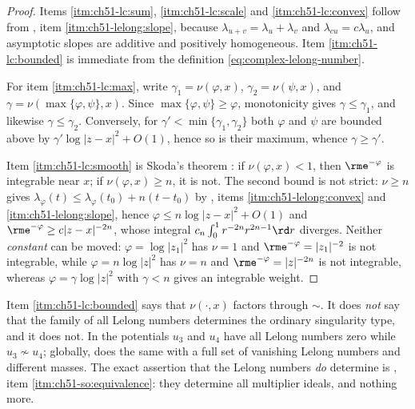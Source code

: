 \begin{proof}
Items \cref{itm:ch51-lc:sum}, \cref{itm:ch51-lc:scale} and
\cref{itm:ch51-lc:convex} follow from
, item \cref{itm:ch51-lelong:slope}, because
\(\lambda_{u+v}=\lambda_u+\lambda_v\) and
\(\lambda_{cu}=c\lambda_u\), and asymptotic slopes are additive and
positively homogeneous.  Item \cref{itm:ch51-lc:bounded} is immediate from
the definition \eqref{eq:complex-lelong-number}.

For item \cref{itm:ch51-lc:max}, write \(\gamma_1=\nu(\varphi,x)\),
\(\gamma_2=\nu(\psi,x)\), and \(\gamma=\nu(\max\{\varphi,\psi\},x)\).
Since \(\max\{\varphi,\psi\}\geq\varphi\), monotonicity gives
\(\gamma\leq\gamma_1\), and likewise \(\gamma\leq\gamma_2\).  Conversely,
for \(\gamma'<\min\{\gamma_1,\gamma_2\}\) both \(\varphi\) and \(\psi\)
are bounded above by \(\gamma'\log|z-x|^2+O(1)\), hence so is their
maximum, whence \(\gamma\geq\gamma'\).

Item \cref{itm:ch51-lc:smooth} is Skoda's theorem \cite{Sko72}: if
\(\nu(\varphi,x)<1\), then \(\rme^{-\varphi}\) is integrable near \(x\);
if \(\nu(\varphi,x)\geq n\), it is not.  The second bound is not strict:
\(\nu\geq n\) gives \(\lambda_\varphi(t)\leq\lambda_\varphi(t_0)+n(t-t_0)\)
by , items \cref{itm:ch51-lelong:convex} and
\cref{itm:ch51-lelong:slope}, hence
\(\varphi\leq n\log|z-x|^2+O(1)\) and
\(\rme^{-\varphi}\geq c|z-x|^{-2n}\), whose integral
\(c_n\int_0^1r^{-2n}r^{2n-1}\rd r\) diverges.  Neither \emph{constant} can
be moved: \(\varphi=\log|z_1|^2\) has \(\nu=1\) and
\(\rme^{-\varphi}=|z_1|^{-2}\) is not integrable, while
\(\varphi=n\log|z|^2\) has \(\nu=n\) and \(\rme^{-\varphi}=|z|^{-2n}\) is
not integrable, whereas \(\varphi=\gamma\log|z|^2\) with \(\gamma<n\) gives
an integrable weight.
\end{proof}

\begin{remark}
\label{rem:ch51-lelong-not-faithful}
Item \cref{itm:ch51-lc:bounded} says that \(\nu(\cdot,x)\) factors through
\(\sim\).  It does \emph{not} say that the family of all Lelong numbers
determines the ordinary singularity type, and it does not.  In
 the potentials \(u_3\) and \(u_4\) have
all Lelong numbers zero while \(u_3\not\sim u_4\); globally,
 does the same with a full set of vanishing Lelong
numbers and different masses.  The exact assertion that the Lelong numbers
\emph{do} determine is , item
\cref{itm:ch51-so:equivalence}: they determine all multiplier ideals, and
nothing more.
\end{remark}

